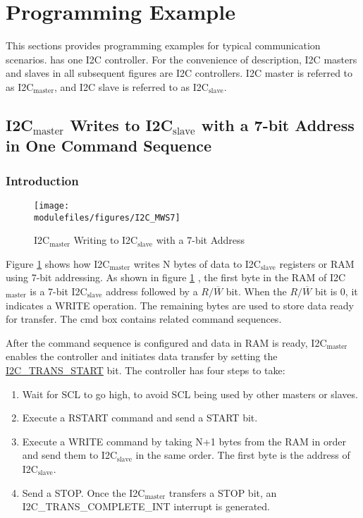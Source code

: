 \documentclass[main\_\_EN.tex]{subfiles}
\begin{document}
\section{Programming Example}
This sections provides programming examples for typical communication scenarios. \chipname{} has one I2C controller. For the convenience of description, I2C masters and slaves in all subsequent figures are \chipname{} I2C controllers. I2C master is referred to as I2C$_\text{master}$, and I2C slave is referred to as I2C$_\text{slave}$.

\subsection{\texorpdfstring{I2C$_\text{master}$ Writes to I2C$_\text{slave}$ with a 7-bit Address in One Command Sequence}{I2C master Writes to I2C slave with a 7-bit Address in One Command Sequence}}\label{subsec:i2c-mws7}
\subsubsection{Introduction}
\begin{figure}[H]
    \centering
    \texttt{[image: \\modulefiles/figures/I2C\_MWS7]}
    \caption{I2C$_\text{master}$ Writing to I2C$_\text{slave}$ with a 7-bit Address}
    \label{fig:i2c-mws7}
\end{figure}

Figure \ref{fig:i2c-mws7} shows how I2C$_\text{master}$ writes N bytes of data to I2C$_\text{slave}$ registers or RAM using 7-bit addressing. As shown in figure \ref{fig:i2c-mws7} , the first byte in the RAM of I2C$_\text{master}$ is a 7-bit I2C$_\text{slave}$ address followed by a $R/\overline W$ bit. When the $R/\overline W$ bit is 0, it indicates a WRITE operation. The remaining bytes are used to store data ready for transfer. The cmd box contains related command sequences.

After the command sequence is configured and data in RAM is ready, I2C$_\text{master}$ enables the controller and initiates data transfer by setting the \hyperref[fielddesc:I2CTRANSSTART]{I2C\_TRANS\_START} bit. The controller has four steps to take:
\begin{enumerate}
    \item Wait for SCL to go high, to avoid SCL being used by other masters or slaves.
    \item Execute a RSTART command and send a START bit.
    \item Execute a WRITE command by taking N+1 bytes from the RAM in order and send them to I2C$_\text{slave}$ in the same order. The first byte is the address of I2C$_\text{slave}$.
    \item Send a STOP. Once the I2C$_\text{master}$ transfers a STOP bit, an I2C\_TRANS\_COMPLETE\_INT interrupt is generated.
\end{enumerate}
\end{document}
